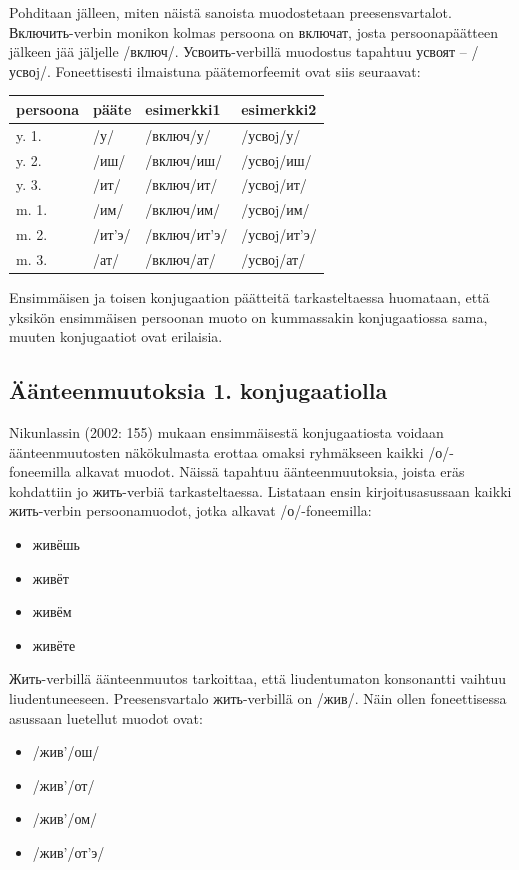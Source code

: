 \documentclass[]{scrreprt}
\providecommand{\tightlist}{%
  \setlength{\itemsep}{0pt}\setlength{\parskip}{0pt}}
\begin{document}
Pohditaan jälleen, miten näistä sanoista muodostetaan preesensvartalot.
Включить-verbin monikon kolmas persoona on включат, josta
persoonapäätteen jälkeen jää jäljelle /включ/. Усвоить-verbillä
muodostus tapahtuu усвоят -- /усвоj/. Foneettisesti ilmaistuna
päätemorfeemit ovat siis seuraavat:

\begin{longtable}[c]{@{}llll@{}}
\toprule
persoona & pääte & esimerkki1 & esimerkki2\tabularnewline
\midrule
\endhead
y. 1. & /у/ & /включ/у/ & /усвоj/у/\tabularnewline
y. 2. & /иш/ & /включ/иш/ & /усвоj/иш/\tabularnewline
y. 3. & /ит/ & /включ/ит/ & /усвоj/ит/\tabularnewline
m. 1. & /им/ & /включ/им/ & /усвоj/им/\tabularnewline
m. 2. & /ит'э/ & /включ/ит'э/ & /усвоj/ит'э/\tabularnewline
m. 3. & /ат/ & /включ/ат/ & /усвоj/ат/\tabularnewline
\bottomrule
\end{longtable}

Ensimmäisen ja toisen konjugaation päätteitä tarkasteltaessa huomataan,
että yksikön ensimmäisen persoonan muoto on kummassakin konjugaatiossa
sama, muuten konjugaatiot ovat erilaisia.

\subsection{Äänteenmuutoksia 1.
konjugaatiolla}\label{uxe4uxe4nteenmuutoksia-1.-konjugaatiolla}

Nikunlassin (2002: 155) mukaan ensimmäisestä konjugaatiosta voidaan
äänteenmuutosten näkökulmasta erottaa omaksi ryhmäkseen kaikki
/о/-foneemilla alkavat muodot. Näissä tapahtuu äänteenmuutoksia, joista
eräs kohdattiin jo жить-verbiä tarkasteltaessa. Listataan ensin
kirjoitusasussaan kaikki жить-verbin persoonamuodot, jotka alkavat
/о/-foneemilla:

\begin{itemize}
\tightlist
\item
  живёшь
\item
  живёт
\item
  живём
\item
  живёте
\end{itemize}

Жить-verbillä äänteenmuutos tarkoittaa, että liudentumaton konsonantti
vaihtuu liudentuneeseen. Preesensvartalo жить-verbillä on /жив/. Näin
ollen foneettisessa asussaan luetellut muodot ovat:

\begin{itemize}
\tightlist
\item
  /жив'/ош/
\item
  /жив'/от/
\item
  /жив'/ом/
\item
  /жив'/от'э/
\end{itemize}
\end{document}
